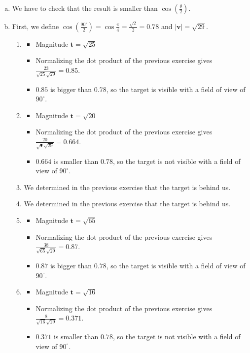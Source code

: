 \documentclass[11pt]{article}
\begin{document}
\begin{enumerate}[a.]
	\item %
	We have to check that the result is smaller than $\cos(\frac{\theta}{2})$.
	
	\item %
	First, we define $\cos(\frac{90^\circ}{2})=\cos\frac{\pi}{4}=\frac{\sqrt{2}}{2}=0.78$ and $|\textbf{v}|=\sqrt{29}$.
	\begin{enumerate}[1.)]
	
	\item %
	\begin{itemize}
		\item Magnitude $\textbf{t}=\sqrt{25}$
		\item Normalizing the dot product of the previous exercise gives $\frac{23}{\sqrt{25}\sqrt{29}}=0.85$.
		\item $0.85$ is bigger than $0.78$, so the target is visible with a field of view of $90^\circ$.
	\end{itemize}
	
	\item %
	\begin{itemize}
		\item Magnitude $\textbf{t}=\sqrt{20}$
		\item Normalizing the dot product of the previous exercise gives $\frac{20}{\sqrt{•}\sqrt{29}}=0.664$.
		\item $0.664$ is smaller than $0.78$, so the target is not visible with a field of view of $90^\circ$.
	\end{itemize}
	
	\item %
	We determined in the previous exercise that the target is behind us.	
	
	\item %
	We determined in the previous exercise that the target is behind us.
	
	\item %
	\begin{itemize}
		\item Magnitude $\textbf{t}=\sqrt{65}$
		\item Normalizing the dot product of the previous exercise gives $\frac{38}{\sqrt{65}\sqrt{29}}=0.87$.
		\item $0.87$ is bigger than $0.78$, so the target is visible with a field of view of $90^\circ$.
	\end{itemize}
	
	\item %
	\begin{itemize}
		\item Magnitude $\textbf{t}=\sqrt{16}$
		\item Normalizing the dot product of the previous exercise gives $\frac{8}{\sqrt{16}\sqrt{29}}=0.371$.
		\item $0.371$ is smaller than $0.78$, so the target is not visible with a field of view of $90^\circ$.
	\end{itemize}
	

\end{enumerate}
\end{enumerate}
\end{document}
